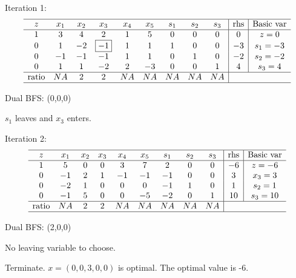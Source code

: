 \documentclass[12pt]{article}
\begin{document}
Iteration 1: 
\begin{equation*}
  \begin{array}{ccccccccc|c|c}
    \hline
    z &  x_1      &  x_2 &  x_3 & x_4 & x_5 & s_1 & s_2 & s_3 &  \text{rhs} & \text{Basic var}  \\ \hline
    1 &    3      &    4 &    2 &    1 & 5    & 0 & 0 & 0 &     0  &  z=0              \\
    0 &    1      &    -2 &    \boxed{-1} &    1 &    1 & 1 & 0 & 0 & -3      &  s_1 = -3          \\
    0 &    -1      &    -1 &    -1 &    1 &    1 & 0 & 1 & 0 & -2   &  s_2 = -2          \\ 
    0 &    1      &    1 &    -2 &    2 &    -3 & 0 & 0 & 1 & 4   &  s_3 = 4          \\ \hline
    \text{ratio} &    NA      &    2 &    2 &    NA &    NA & NA & NA & NA                    \\ \hline
  \end{array}
\end{equation*}

Dual BFS: (0,0,0)

$s_1$ leaves and $x_3$ enters.

Iteration 2: 
\begin{equation*}
  \begin{array}{ccccccccc|c|c}
    \hline
    z &  x_1      &  x_2 &  x_3 & x_4 & x_5 & s_1 & s_2 & s_3 &  \text{rhs} & \text{Basic var}  \\ \hline
    1 &    5      &    0 &    0 &    3 & 7    & 2 & 0 & 0 &     -6  &  z=-6              \\
    0 &    -1      &    2 &    1 &    -1 &    -1 & -1 & 0 & 0 & 3      &  x_3 = 3          \\
    0 &    -2      &    1 &    0  &    0 &    0 & -1 & 1 & 0 & 1   &  s_2 = 1          \\ 
    0 &    -1      &    5 &    0 &    0 &    -5 & -2 & 0 & 1 & 10   &  s_3 = 10          \\ \hline
    \text{ratio} &    NA      &    2 &    2 &    NA &    NA & NA & NA & NA                    \\ \hline
  \end{array}
\end{equation*}

Dual BFS: (2,0,0)

No leaving variable to choose.

Terminate. $x=(0,0,3,0,0)$ is optimal. The optimal value is -6.
\end{document}
